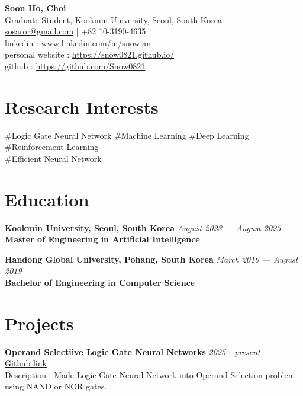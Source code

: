 \documentclass[11pt, a4paper]{article}
\newcommand{\itemheader}[2]{
    \noindent\textbf{#1} \hfill \textit{#2} \\
}
\begin{document}
{\huge \textbf{Soon Ho, Choi}}\\[0.1cm]
Graduate Student, Kookmin University, Seoul, South Korea \\
\href{mailto:sosaror@gmail.com}{sosaror@gmail.com} | +82 10-3190-4635 \\
linkedin : \href{https://www.linkedin.com/in/snowian}{www.linkedin.com/in/snowian} \\
personal website : \href{https://snow0821.github.io/}{https://snow0821.github.io/} \\
github : \href{https://github.com/Snow0821}{https://github.com/Snow0821}

\vspace{0.3cm}

\section*{Research Interests}
\noindent
\#Logic Gate Neural Network 
\#Machine Learning 
\#Deep Learning 
\#Reinforcement Learning \\
\#Efficient Neural Network

\section*{Education}
\itemheader{Kookmin University, Seoul, South Korea}{August 2023 — August 2025}
\textbf{Master of Engineering in Artificial Intelligence} \\

\vspace{0.3cm}

\itemheader{Handong Global University, Pohang, South Korea}{March 2010 — August 2019}
\textbf{Bachelor of Engineering in Computer Science} 


\section*{Projects}
\itemheader{Operand Selectiive Logic Gate Neural Networks}{2025 - present}
\href{https://github.com/Snow0821/oslgn}{Github link}\\
Description : Made Logic Gate Neural Network into Operand Selection problem using NAND or NOR gates.\\
\end{document}
